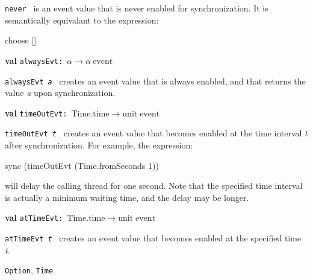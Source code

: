 \begin{descr}
\begin{speccomment}
\item {\tt never           } 
is an event value that is never enabled for synchronization.\- 	  It is semantically equivalant to the expression: 	  
\begin{code}
	    choose []
	  
\end{code}
     \end{speccomment}
\item {}{\textbf{val}} {\tt alwaysEvt: \(\alpha\rightarrow \alpha\:\mathrm{event}\)}\label{val-CML.alwaysEvt}


\begin{speccomment}
\item {\tt always\-Evt \textit{a}           } 
creates an event value that is always enabled, and that returns 	  the value \textit{a} upon synchronization.\-     \end{speccomment}
\item {}{\textbf{val}} {\tt timeOutEvt: \(\mathrm{Time}.\mathrm{time}\rightarrow \mathrm{unit}\;\mathrm{event}\)}\label{val-CML.timeOutEvt}


\begin{speccomment}
\item {\tt time\-Out\-Evt \textit{t}           } 
creates an event value that becomes enabled at the time 	  interval \textit{t} after synchronization.\- 	  For example, the expression: 	  
\begin{code}
	    sync (time\-Out\-Evt (Time.fromSeconds 1))
	  
\end{code}
 	  will delay the calling thread for one second.\- 	  Note that the specified time interval is actually a minimum 	  waiting time, and the delay may be longer.\-     \end{speccomment}
\item {}{\textbf{val}} {\tt atTimeEvt: \(\mathrm{Time}.\mathrm{time}\rightarrow \mathrm{unit}\;\mathrm{event}\)}\label{val-CML.atTimeEvt}


\begin{speccomment}
\item {\tt at\-Time\-Evt \textit{t}           } 
creates an event value that becomes enabled at the specified time 	  \textit{t}.\-     \end{speccomment}
\end{descr}

\begin{seealso}
\texttt{Option}, \texttt{Time}
\end{seealso}
